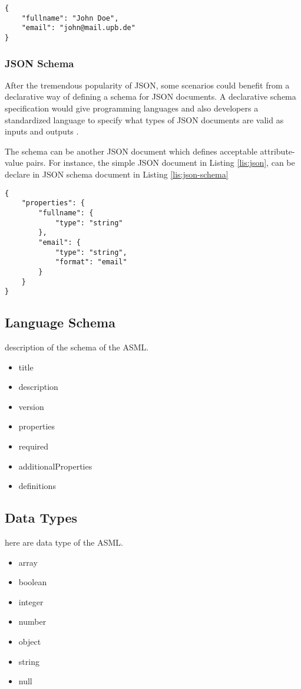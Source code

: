 \lstset{
  label=lis:json, caption=A simple JSON document., 
  basicstyle=\ttfamily\footnotesize, frame=single, captionpos=b,
  xleftmargin=.15\textwidth, xrightmargin=.15\textwidth
}
\begin{lstlisting}
{
    "fullname": "John Doe",
    "email": "john@mail.upb.de"
}
\end{lstlisting}

\subsubsection{JSON Schema}
After the tremendous popularity of JSON, some scenarios could benefit from a declarative way of defining a schema for JSON documents. A declarative schema specification would give programming languages and also developers a standardized language to specify what types of JSON documents are valid as inputs and outputs \cite{json-schema}.

The schema can be another JSON document which defines acceptable attribute-value pairs. For instance, the simple JSON document in Listing \ref{lis:json}, can be declare in JSON schema document in Listing \ref{lis:json-schema}

\lstset{
  label=lis:json-schema, caption=A simple JSON schema document., 
  basicstyle=\ttfamily\footnotesize, frame=single, captionpos=b,
  xleftmargin=.15\textwidth, xrightmargin=.15\textwidth
}
\begin{lstlisting}
{
    "properties": {
        "fullname": {
            "type": "string"
        },
        "email": {
            "type": "string",
            "format": "email"
        }
    }
}
\end{lstlisting}


\subsection{Language Schema}
description of the schema of the ASML.

\begin{itemize}
\item title
\item description
\item version
\item properties
\item required
\item additionalProperties
\item definitions
\end{itemize}

\subsection{Data Types}
here are data type of the ASML.


\begin{itemize}
\item array
\item boolean
\item integer
\item number
\item object
\item string
\item null
\end{itemize}
